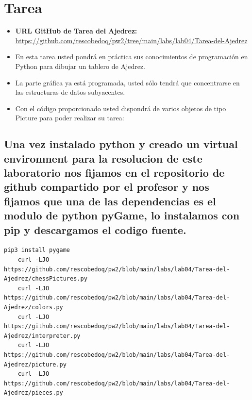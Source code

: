 \section{Tarea}


\begin{itemize}
    \item \textbf{URL GitHub de Tarea del Ajedrez:} \url{https://github.com/rescobedoq/pw2/tree/main/labs/lab04/Tarea-del-Ajedrez}
    \item En esta tarea usted pondrá en práctica sus conocimientos de programación en Python para dibujar un tablero de Ajedrez.
    \item La parte gráfica ya está programada, usted sólo tendrá que concentrarse en las estructuras de datos subyacentes.
    \item Con el código proporcionado usted dispondrá de varios objetos de tipo Picture para poder realizar su tarea:
\end{itemize}
\subsection{Una vez instalado python y creado un virtual environment para la resolucion de este laboratorio 
	nos fijamos en el repositorio de github compartido por el profesor y nos fijamos que una de 
	las dependencias es el modulo de python pyGame, lo instalamos con pip y descargamos el codigo fuente.}

\begin{lstlisting}[style=mybash]
	pip3 install pygame
	curl -LJO https://github.com/rescobedoq/pw2/blob/main/labs/lab04/Tarea-del-Ajedrez/chessPictures.py
	curl -LJO https://github.com/rescobedoq/pw2/blob/main/labs/lab04/Tarea-del-Ajedrez/colors.py
	curl -LJO https://github.com/rescobedoq/pw2/blob/main/labs/lab04/Tarea-del-Ajedrez/interpreter.py
	curl -LJO https://github.com/rescobedoq/pw2/blob/main/labs/lab04/Tarea-del-Ajedrez/picture.py
	curl -LJO https://github.com/rescobedoq/pw2/blob/main/labs/lab04/Tarea-del-Ajedrez/pieces.py
\end{lstlisting}

